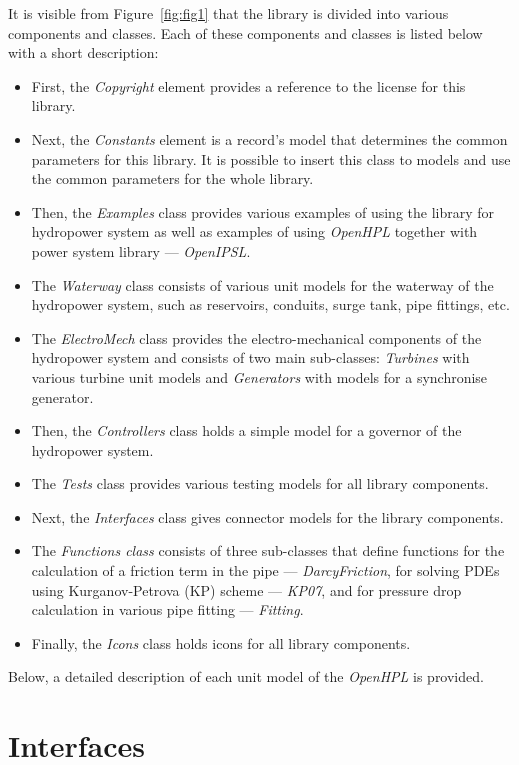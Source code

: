 \documentclass[%
]{USN-PhD}
\begin{document}
It is visible from Figure~\ref{fig:fig1} that the library is divided into various components and classes. Each of these components and classes is listed below with a short description:
\begin{itemize}
    \item First, the \emph{Copyright} element provides a reference to the license for this library.
    \item Next, the \emph{Constants} element is a record's model that determines the common parameters for this library. It is possible to insert this class to models and use the common parameters for the whole library.
    \item Then, the \emph{Examples} class provides various examples of using the library for hydropower system as well as examples of using \emph{OpenHPL} together with power system library --- \emph{OpenIPSL}.
    \item The \emph{Waterway} class consists of various unit models for the waterway of the hydropower system, such as reservoirs, conduits, surge tank, pipe fittings, etc.
    \item The \emph{ElectroMech} class provides the electro-mechanical components of the hydropower system and consists of two main sub-classes: \emph{Turbines} with various turbine unit models and \emph{Generators} with models for a synchronise generator.
    \item Then, the \emph{Controllers} class holds a simple model for a governor of the hydropower system.
    \item The \emph{Tests} class provides various testing models for all library components.
    \item Next, the \emph{Interfaces} class gives connector models for the library components.
    \item The \emph{Functions class} consists of three sub-classes that define functions for the calculation of a friction term in the pipe --- \emph{DarcyFriction}, for solving PDEs using Kurganov-Petrova (KP) scheme --- \emph{KP07}, and for pressure drop calculation in various pipe fitting --- \emph{Fitting}.
    \item Finally, the \emph{Icons} class holds icons for all library components.
\end{itemize}
Below, a detailed description of each unit model of the \emph{OpenHPL} is provided.

\section{Interfaces}
\end{document}
